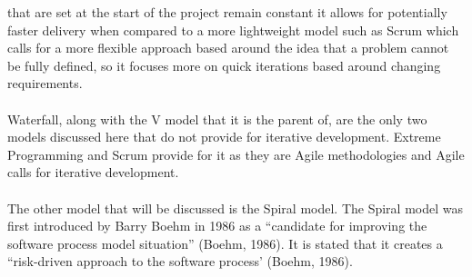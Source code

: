 \documentclass{CRPITStyle}
\begin{document}
		that are set at the start of the project remain constant it allows for potentially faster delivery when compared to a more lightweight
		model such as Scrum which calls for a more flexible approach based around the idea that a problem cannot be fully defined, so it focuses
		more on quick iterations based around changing requirements.\\
		~\\
		Waterfall, along with the V model that it is the parent of, are the only two models discussed here that do not provide for iterative
		development. Extreme Programming and Scrum provide for it as they are Agile methodologies and Agile calls for iterative development.\\
		~\\
		 The other model that will be discussed is the Spiral model. The Spiral model was first introduced by Barry Boehm in 
		 1986 as a ``candidate for improving the software process model situation'' (Boehm, 1986). It is stated that it creates a ``risk-driven
		 approach to the software process' (Boehm, 1986).\\
		 ~\\
		 
\end{document}
